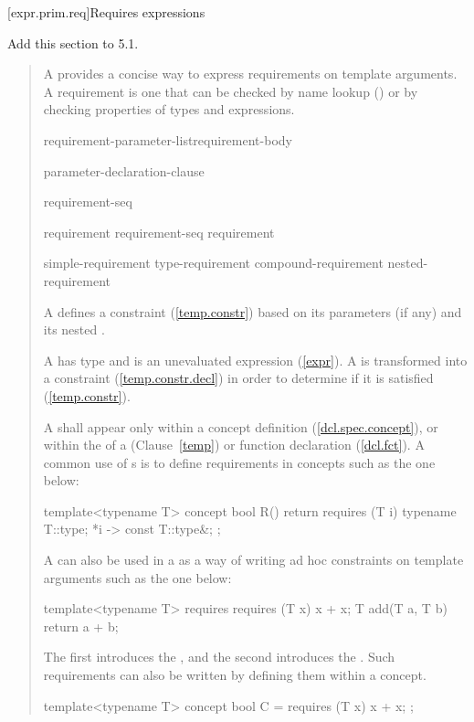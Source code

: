 [expr.prim.req]{Requires expressions}

Add this section to 5.1.

\begin{quote}

\pnum
A  provides a concise way to express 
requirements on template arguments. 
% 
A requirement is one that can be checked by name lookup
() or by checking properties of types and expressions.

\begin{bnf}
\br
     requirement-parameter-list\opt requirement-body

\br
    \terminal{(} parameter-declaration-clause\opt~\terminal{)}
  
\br
    \terminal{\{} requirement-seq \terminal{\}}

\br
    requirement\br
    requirement-seq requirement

\br
    simple-requirement\br
    type-requirement\br
    compound-requirement\br
    nested-requirement
\end{bnf}

\pnum
A  defines a constraint (\ref{temp.constr})
based on its parameters (if any) and its nested .

\pnum
A  has type  and is an 
unevaluated expression (\ref{expr}).
\enternote
A  is transformed into a constraint 
(\ref{temp.constr.decl}) in order to determine if it is 
satisfied (\ref{temp.constr}).
\exitnote

\pnum
A  shall appear
only within a concept definition (\ref{dcl.spec.concept}),
or within the  of a
(Clause~\ref{temp}) or function declaration (\ref{dcl.fct}).
% 
\enterexample
A common use of s is to define
requirements in concepts such as the one below:
\begin{codeblock}
template<typename T>
  concept bool R() {
    return requires (T i) {
      typename T::type;
      {*i} -> const T::type&;
    };
  }
\end{codeblock}
A  can also be used in a 
 as a way of writing ad hoc 
constraints on template arguments such as the one below:
\begin{codeblock}
template<typename T>
  requires requires (T x) { x + x; }
    T add(T a, T b) { return a + b; }
\end{codeblock}
The first  introduces the 
, and the second
introduces the .
\exitexample
\enternote
Such requirements can also be written by defining them within
a concept.
\begin{codeblock}
template<typename T>
  concept bool C = requires (T x) { x + x; };


\end{codeblock}
\end{quote}
